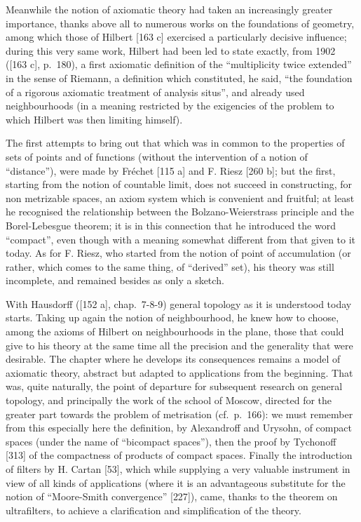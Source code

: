 Meanwhile the notion of axiomatic theory had taken an increasingly greater importance, thanks above all to numerous works on the foundations of geometry, among which those of Hilbert {[}163 c{]} exercised a particularly decisive influence; during this very same work, Hilbert had been led to state exactly, from 1902 ({[}163 c{]}, p.~180), a first axiomatic definition of the ``multiplicity twice extended'' in the sense of Riemann, a definition which constituted, he said, ``the foundation of a rigorous axiomatic treatment of analysis situs'', and already used neighbourhoods (in a meaning restricted by the exigencies of the problem to which Hilbert was then limiting himself).

The first attempts to bring out that which was in common to the properties of sets of points and of functions (without the intervention of a notion of ``distance''), were made by Fréchet {[}115 a{]} and F. Riesz {[}260 b{]}; but the first, starting from the notion of countable limit, does not succeed in constructing, for non metrizable spaces, an axiom system which is convenient and fruitful; at least he recognised the relationship between the Bolzano-Weierstrass principle and the Borel-Lebesgue theorem; it is in this connection that he introduced the word ``compact'', even though with a meaning somewhat different from that given to it today. As for F. Riesz, who started from the notion of point of accumulation (or rather, which comes to the same thing, of ``derived'' set), his theory was still incomplete, and remained besides as only a sketch.

With Hausdorff ({[}152 a{]}, chap.~7-8-9) general topology as it is understood today starts. Taking up again the notion of neighbourhood, he knew how to choose, among the axioms of Hilbert on neighbourhoods in the plane, those that could give to his theory at the same time all the precision and the generality that were desirable. The chapter where he develops its consequences remains a model of axiomatic theory, abstract but adapted to applications from the beginning. That was, quite naturally, the point of departure for subsequent research on general topology, and principally the work of the school of Moscow, directed for the greater part towards the problem of metrisation (cf.~p.~166): we must remember from this especially here the definition, by Alexandroff and Urysohn, of compact spaces (under the name of ``bicompact spaces''), then the proof by Tychonoff {[}313{]} of the compactness of products of compact spaces. Finally the introduction of filters by H. Cartan {[}53{]}, which while supplying a very valuable instrument in view of all kinds of applications (where it is an advantageous substitute for the notion of ``Moore-Smith convergence'' {[}227{]}), came, thanks to the theorem on ultrafilters, to achieve a clarification and simplification of the theory.

